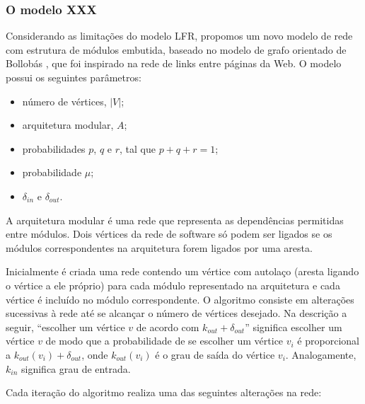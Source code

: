 \documentclass{acm_proc_article-sp}
\begin{document}
\subsubsection{O modelo XXX}

Considerando as limitações do modelo LFR, propomos um novo modelo de rede com estrutura de módulos embutida, baseado no modelo de grafo orientado de Bollobás \cite{Bollobas2003}, que foi inspirado na rede de links entre páginas da Web. O modelo possui os seguintes parâmetros:

\begin{itemize}
  \item número de vértices, $|V|$;
  \item arquitetura modular, $A$;
  \item probabilidades $p$, $q$ e $r$, tal que $p + q + r = 1$;
  \item probabilidade $\mu$;
  \item $\delta_{in}$ e $\delta_{out}$.
\end{itemize}

A arquitetura modular é uma rede que representa as dependências permitidas entre módulos. Dois vértices da rede de software só podem ser ligados se os módulos correspondentes na arquitetura forem ligados por uma aresta.

Inicialmente é criada uma rede contendo um vértice com autolaço (aresta ligando o vértice a ele próprio) para cada módulo representado na arquitetura e cada vértice é incluído no módulo correspondente. O algoritmo consiste em alterações sucessivas à rede até se alcançar o número de vértices desejado. Na descrição a seguir, ``escolher um vértice $v$ de acordo com $k_{out} + \delta_{out}$'' significa escolher um vértice $v$ de modo que a probabilidade de se escolher um vértice $v_i$ é proporcional a $k_{out}(v_i) + \delta_{out}$, onde $k_{out}(v_i)$ é o grau de saída do vértice $v_i$. Analogamente, $k_{in}$ significa grau de entrada.

Cada iteração do algoritmo realiza uma das seguintes alterações na rede:
\end{document}
